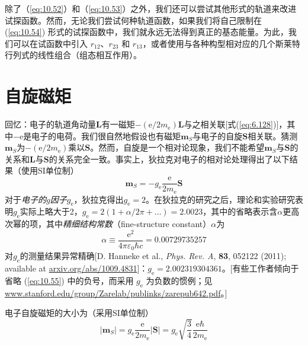     除了（\ref{eq:10.52}）和（\ref{eq:10.53}）之外，我们还可以尝试其他形式的轨道来改进试探函数。然而，无论我们尝试何种轨道函数，如果我们将自己限制在 (\ref{eq:10.54}) 形式的试探函数中，我们就永远无法得到真正的基态能量。为此，我们可以在试函数中引入 $r_{12}$、$r_{23}$ 和 $r_{13}$，或者使用与各种构型相对应的几个斯莱特行列式的线性组合（组态相互作用）。

\section{自旋磁矩}
\label{sec:10.9 Spin Magnetic Moment}

    回忆：电子的轨道角动量$\mathbf{L}$有一磁矩$-\left(\mathrm{e}/2m_{\mathrm{e}}\right)\mathbf{L}$与之相关联[式(\ref{eq:6.128})]，其中$-\mathrm{e}$是电子的电荷。我们很自然地假设也有磁矩$\mathbf{m}_S$与电子的自旋$\mathbf{S}$相关联。猜测$\mathbf{m}_S$为$-\left(\mathrm{e}/2m_{\mathrm{e}}\right)$乘以$\mathbf{S}$。然而，自旋是一个相对论现象，我们不能希望$\mathbf{m}_S$与$\mathbf{S}$的关系和$\mathbf{L}$与$\mathbf{S}$的关系完全一致。事实上，狄拉克对电子的相对论处理得出了以下结果（使用SI单位制）
    \begin{equation}
        \mathbf{m}_S = -g_{\mathrm{e}} \frac{\mathrm{e}}{2m_{\mathrm{e}}} \mathbf{S}
        \label{eq:10.55}
    \end{equation}
    对于\textit{电子的$g$因子$g_{\mathrm{e}}$}，狄拉克得出$g_{\mathrm{e}} = 2$。在狄拉克的研究之后，理论和实验研究表明$g_{\mathrm{e}}$实际上略大于2，$g_{\mathrm{e}} = 2\left(1 + \alpha/2\pi + \ldots\right) = 2.0023$，其中的省略表示含$\alpha$更高次幂的项，其中\textit{精细结构常数}（fine-structure constant）$\alpha$为
    \begin{equation}
        \alpha \equiv \frac{\mathrm{e}^2}{4\pi\varepsilon_0\hbar c} = 0.00729735257
        \label{eq:10.56}
    \end{equation}
    对$g_{\mathrm{e}}$的测量结果异常精确[D. Hanneke et al., \textit{Phys. Rev. A}, \textbf{83}, 052122 (2011); available at \url{arxiv.org/abs/1009.4831}]：$g_{\mathrm{e}} = 2.002319304361$。[有些工作者倾向于省略 (\ref{eq:10.55}) 中的负号，而采用 $g_{\mathrm{e}}$ 为负数的惯例；见\url{www.stanford.edu/group/Zarelab/publinks/zarepub642.pdf}。]

    电子自旋磁矩的大小为（采用SI单位制）
    \begin{equation}
        \left|\mathbf{m}_{S}\right| = g_{\mathrm{e}} \frac{\mathrm{e}}{2m_{\mathrm{e}}} \left|\mathbf{S}\right| = g_{\mathrm{e}} \sqrt{\frac{3}{4}} \frac{\mathrm{e}\hbar}{2m_{\mathrm{e}}}
        \label{eq:10.57}
    \end{equation}


